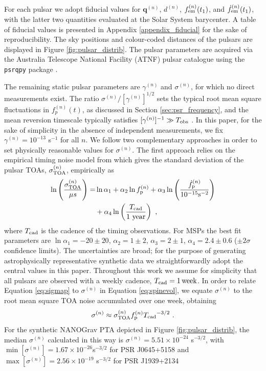 \documentclass[fleqn,usenatbib,useAMS]{mnras}
\begin{document}
For each pulsar we adopt fiducial values for ${\boldsymbol{q}}^{(n)}$, $d^{(n)}$, $f_{\rm em}^{(n)}(t_1)$, and $\dot{f}^{(n)}_{\rm em}(t_1)$, with the latter two quantities evaluated at the Solar System barycenter. A table of fiducial values is presented in Appendix \ref{appendix_fiducial} for the sake of reproducibility. The sky positions and colour-coded distances of the pulsars are displayed in Figure \ref{fig:pulsar_distrib}. The pulsar parameters are acquired via the Australia Telescope National Facility (ATNF) pulsar catalogue \citep{Manchester2005} using the \texttt{psrqpy} package \citep{psrqpy}. \newline 

The remaining static pulsar parameters are $\gamma^{(n)}$ and $\sigma^{(n)}$, for which no direct measurements exist. The ratio $\sigma^{(n)} / [\gamma^{(n)}]^{1/2}$ sets the typical root mean square fluctuations in $f_p^{(n)}(t)$, as discussed in Section \ref{sec:psr_frequency}, and the mean reversion timescale typically satisfies $[\gamma^{(n)}]^{-1} \gg T_{\rm obs}$ \citep{Price2012,Myers2021MNRAS.502.3113M,Meyers2021,Vargas}. In this paper, for the sake of simplicity in the absence of independent measurements, we fix $\gamma^{(n)} = 10^{-13}$ s$^{-1}$ for all $n$. We follow two complementary approaches in order to  set physically reasonable values for $\sigma^{(n)}$. The first approach relies on the empirical timing noise model from \cite{Shannon2010ApJ...725.1607S} which gives the standard deviation of the pulsar TOAs, $\sigma_{\rm TOA}^{(n)}$, empirically as
\begin{align}
	\ln \left(\frac{\sigma_{\rm TOA}^{(n)}}{\mu s} \right)=& \ln \alpha_1 +  \alpha_2 \ln f_{\rm p}^{(n)} + \alpha_3 \ln \left(\frac{\dot{f}_{\rm p}^{(n)}}{10^{-15} \text{s}^{-2}} \right) \nonumber \\ 
	&+ \alpha_4 \ln \left( \frac{T_{\rm cad}}{ 1 \text{ year}} \right) \ , \label{eq:sigmap}
\end{align}
where $T_{\rm cad}$ is the cadence of the timing observations. For MSPs the best fit parameters are $\ln \alpha_1 = -20 \pm 20$, $\alpha_2 = 1 \pm 2 $, $\alpha_3 = 2 \pm 1$, $\alpha_4 = 2.4 \pm 0.6$ ($\pm 2\sigma$ confidence limits). The uncertainties are broad; for the purpose of generating astrophysically representative synthetic data we straightforwardly adopt the central values in this paper. Throughout this work we assume for simplicity that all pulsars are observed with a weekly cadence, $T_{\rm cad} = 1 \,{\rm week}$. In order to relate Equation \eqref{eq:sigmap} to $\sigma^{(n)}$ in Equation \eqref{eq:spinevol}, we equate $\sigma^{(n)}$ to the root mean square TOA noise accumulated over one week, obtaining
\begin{eqnarray}
	\sigma^{(n)} \approx \sigma_{\rm TOA}^{(n)} f_{\rm p}^{(n)} {T_{\rm cad}}^{-3/2} \ . \label{eq:sigmap_f}
\end{eqnarray}
For the synthetic NANOGrav PTA depicted in Figure \ref{fig:pulsar_distrib}, the median $\sigma^{(n)}$ calculated in this way is $\sigma^{(n)} = 5.51 \times 10^{-24} $ s$^{-3/2}$, with $\min [ \sigma^{(n)} ] = 1.67 \times 10^{-26}$s$^{-3/2}$ for PSR J0645+5158 and $\max [ \sigma^{(n)} ] = 2.56 \times 10^{-19}$ s$^{-3/2}$ for PSR J1939+2134 \newline 
\end{document}
